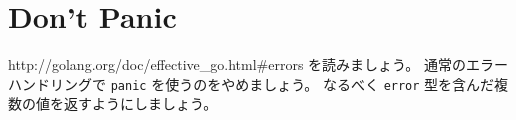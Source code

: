 \section{Don’t Panic}

http:\//\//golang.org\//doc\//effective\_go.html\#errors を読みましょう。 通常のエラーハンドリングで \texttt{panic} を使うのをやめましょう。 なるべく \texttt{error} 型を含んだ複数の値を返すようにしましょう。
